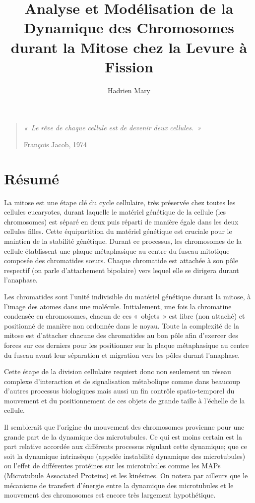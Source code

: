 \documentclass[12pt,a4paper,twoside,openright]{book}
\date{}
\title{Analyse et Modélisation de la Dynamique des Chromosomes durant la Mitose chez la Levure à Fission}
\author{Hadrien Mary}
\begin{document}
\makeflyleaf

\newpage

\pagestyle{empty}

\vspace*{\fill}

\begin{quote}
    {\centerline {\itshape «\ Le rêve de chaque cellule est de devenir deux cellules.\ »}}
    \centerline{François Jacob, 1974}
  \end{quote}\vspace*{\fill}

\newpage

\cleardoublepage
\clearpage\null

\section*{Résumé}

La mitose est une étape clé du cycle cellulaire, très préservée chez
toutes les cellules eucaryotes, durant laquelle le matériel génétique de
la cellule (les chromosomes) est séparé en deux puis réparti de manière
égale dans les deux cellules filles. Cette équipartition du matériel
génétique est cruciale pour le maintien de la stabilité génétique.
Durant ce processus, les chromosomes de la cellule établissent une
plaque métaphasique au centre du fuseau mitotique composée des
chromatides sœurs. Chaque chromatide est attachée à son pôle respectif
(on parle d'attachement bipolaire) vers lequel elle se dirigera durant
l'anaphase.

Les chromatides sont l'unité indivisible du matériel génétique durant la
mitose, à l'image des atomes dans une molécule. Initialement, une fois
la chromatine condensée en chromosomes, chacun de ces «~objets~» est
libre (non attaché) et positionné de manière non ordonnée dans le noyau.
Toute la complexité de la mitose est d'attacher chacune des chromatides
au bon pôle afin d'exercer des forces sur ces derniers pour les
positionner sur la plaque métaphasique au centre du fuseau avant leur
séparation et migration vers les pôles durant l'anaphase.

Cette étape de la division cellulaire requiert donc non seulement un
réseau complexe d'interaction et de signalisation métabolique comme dans
beaucoup d'autres processus biologiques mais aussi un fin contrôle
spatio-temporel du mouvement et du positionnement de ces objets de
grande taille à l'échelle de la cellule.

Il semblerait que l'origine du mouvement des chromosomes provienne pour
une grande part de la dynamique des microtubules. Ce qui est moins
certain est la part relative accordée aux différents processus régulant
cette dynamique; que ce soit la dynamique intrinsèque (appelée
instabilité dynamique des microtubules) ou l'effet de différentes
protéines sur les microtubules comme les MAPs (Microtubule Associated
Proteins) et les kinésines. On notera par ailleurs que le mécanisme de
transfert d'énergie entre la dynamique des microtubules et le mouvement
des chromosomes est encore très largement hypothétique.
\end{document}
